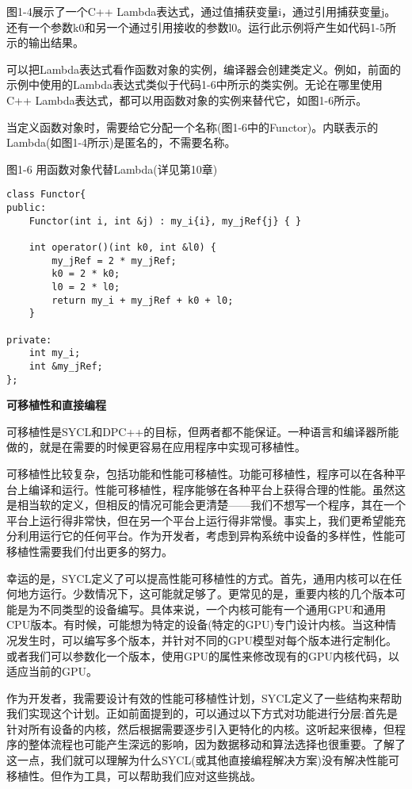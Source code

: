 图1-4展示了一个C++ Lambda表达式，通过值捕获变量i，通过引用捕获变量j。还有一个参数k0和另一个通过引用接收的参数l0。运行此示例将产生如代码1-5所示的输出结果。\par

可以把Lambda表达式看作函数对象的实例，编译器会创建类定义。例如，前面的示例中使用的Lambda表达式类似于代码1-6中所示的类实例。无论在哪里使用C++ Lambda表达式，都可以用函数对象的实例来替代它，如图1-6所示。\par

当定义函数对象时，需要给它分配一个名称(图1-6中的Functor)。内联表示的Lambda(如图1-4所示)是匿名的，不需要名称。\par

图1-6 用函数对象代替Lambda(详见第10章)
\begin{lstlisting}[caption={}]
class Functor{
public:
	Functor(int i, int &j) : my_i{i}, my_jRef{j} { }
	
	int operator()(int k0, int &l0) {
		my_jRef = 2 * my_jRef;
		k0 = 2 * k0;
		l0 = 2 * l0;
		return my_i + my_jRef + k0 + l0;
	}

private:
	int my_i;
	int &my_jRef;
};
\end{lstlisting}

\hspace*{\fill} \par %
\textbf{可移植性和直接编程}

可移植性是SYCL和DPC++的目标，但两者都不能保证。一种语言和编译器所能做的，就是在需要的时候更容易在应用程序中实现可移植性。\par

可移植性比较复杂，包括功能和性能可移植性。功能可移植性，程序可以在各种平台上编译和运行。性能可移植性，程序能够在各种平台上获得合理的性能。虽然这是相当软的定义，但相反的情况可能会更清楚——我们不想写一个程序，其在一个平台上运行得非常快，但在另一个平台上运行得非常慢。事实上，我们更希望能充分利用运行它的任何平台。作为开发者，考虑到异构系统中设备的多样性，性能可移植性需要我们付出更多的努力。\par

幸运的是，SYCL定义了可以提高性能可移植性的方式。首先，通用内核可以在任何地方运行。少数情况下，这可能就足够了。更常见的是，重要内核的几个版本可能是为不同类型的设备编写。具体来说，一个内核可能有一个通用GPU和通用CPU版本。有时候，可能想为特定的设备(特定的GPU)专门设计内核。当这种情况发生时，可以编写多个版本，并针对不同的GPU模型对每个版本进行定制化。或者我们可以参数化一个版本，使用GPU的属性来修改现有的GPU内核代码，以适应当前的GPU。\par

作为开发者，我需要设计有效的性能可移植性计划，SYCL定义了一些结构来帮助我们实现这个计划。正如前面提到的，可以通过以下方式对功能进行分层:首先是针对所有设备的内核，然后根据需要逐步引入更特化的内核。这听起来很棒，但程序的整体流程也可能产生深远的影响，因为数据移动和算法选择也很重要。了解了这一点，我们就可以理解为什么SYCL(或其他直接编程解决方案)没有解决性能可移植性。但作为工具，可以帮助我们应对这些挑战。\par










